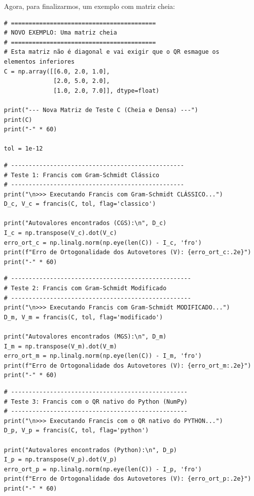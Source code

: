 \documentclass[../numerical_methods.tex]{subfiles}
\begin{document}
Agora, para finalizarmos, um exemplo com matriz cheia:
\begin{listing}[H]
	\begin{verbatim}
# =========================================
# NOVO EXEMPLO: Uma matriz cheia
# =========================================
# Esta matriz não é diagonal e vai exigir que o QR esmague os elementos inferiores
C = np.array([[6.0, 2.0, 1.0],
              [2.0, 5.0, 2.0],
              [1.0, 2.0, 7.0]], dtype=float)

print("--- Nova Matriz de Teste C (Cheia e Densa) ---")
print(C)
print("-" * 60)

tol = 1e-12

\end{verbatim}
	\begin{verbatim}
# -------------------------------------------------
# Teste 1: Francis com Gram-Schmidt Clássico
# -------------------------------------------------
print("\n>>> Executando Francis com Gram-Schmidt CLÁSSICO...")
D_c, V_c = francis(C, tol, flag='classico')

print("Autovalores encontrados (CGS):\n", D_c)
I_c = np.transpose(V_c).dot(V_c)
erro_ort_c = np.linalg.norm(np.eye(len(C)) - I_c, 'fro')
print(f"Erro de Ortogonalidade dos Autovetores (V): {erro_ort_c:.2e}")
print("-" * 60)
\end{verbatim}
\end{listing}
\begin{listing}[H]
	\begin{verbatim}
# ---------------------------------------------------
# Teste 2: Francis com Gram-Schmidt Modificado
# ---------------------------------------------------
print("\n>>> Executando Francis com Gram-Schmidt MODIFICADO...")
D_m, V_m = francis(C, tol, flag='modificado')

print("Autovalores encontrados (MGS):\n", D_m)
I_m = np.transpose(V_m).dot(V_m)
erro_ort_m = np.linalg.norm(np.eye(len(C)) - I_m, 'fro')
print(f"Erro de Ortogonalidade dos Autovetores (V): {erro_ort_m:.2e}")
print("-" * 60)
\end{verbatim}
	\begin{verbatim}
# --------------------------------------------------
# Teste 3: Francis com o QR nativo do Python (NumPy)
# --------------------------------------------------
print("\n>>> Executando Francis com o QR nativo do PYTHON...")
D_p, V_p = francis(C, tol, flag='python')

print("Autovalores encontrados (Python):\n", D_p)
I_p = np.transpose(V_p).dot(V_p)
erro_ort_p = np.linalg.norm(np.eye(len(C)) - I_p, 'fro')
print(f"Erro de Ortogonalidade dos Autovetores (V): {erro_ort_p:.2e}")
print("-" * 60)
\end{verbatim}
\end{listing}
\end{document}
